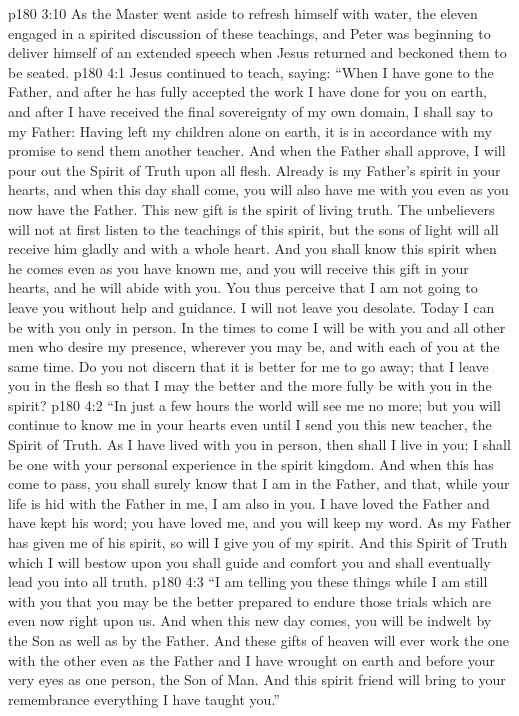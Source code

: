 \vs p180 3:10 As the Master went aside to refresh himself with water, the eleven engaged in a spirited discussion of these teachings, and Peter was beginning to deliver himself of an extended speech when Jesus returned and beckoned them to be seated.\plusone
{}
\vs p180 4:1 Jesus continued to teach, saying: \textcolor{ubdarkred}{“When I have gone to the Father, and after he has fully accepted the work I have done for you on earth, and after I have received the final sovereignty of my own domain, I shall say to my Father: Having left my children alone on earth, it is in accordance with my promise to send them another teacher. And when the Father shall approve, I will pour out the Spirit of Truth upon all flesh. Already is my Father’s spirit in your hearts, and when this day shall come, you will also have me with you even as you now have the Father. This new gift is the spirit of living truth. The unbelievers will not at first listen to the teachings of this spirit, but the sons of light will all receive him gladly and with a whole heart. And you shall know this spirit when he comes even as you have known me, and you will receive this gift in your hearts, and he will abide with you. You thus perceive that I am not going to leave you without help and guidance. I will not leave you desolate. Today I can be with you only in person. In the times to come I will be with you and all other men who desire my presence, wherever you may be, and with each of you at the same time. Do you not discern that it is better for me to go away; that I leave you in the flesh so that I may the better and the more fully be with you in the spirit?}
\vs p180 4:2 \textcolor{ubdarkred}{“In just a few hours the world will see me no more; but you will continue to know me in your hearts even until I send you this new teacher, the Spirit of Truth. As I have lived with you in person, then shall I live in you; I shall be one with your personal experience in the spirit kingdom. And when this has come to pass, you shall surely know that I am in the Father, and that, while your life is hid with the Father in me, I am also in you. I have loved the Father and have kept his word; you have loved me, and you will keep my word. As my Father has given me of his spirit, so will I give you of my spirit. And this Spirit of Truth which I will bestow upon you shall guide and comfort you and shall eventually lead you into all truth.}
\vs p180 4:3 \textcolor{ubdarkred}{“I am telling you these things while I am still with you that you may be the better prepared to endure those trials which are even now right upon us. And when this new day comes, you will be indwelt by the Son as well as by the Father. And these gifts of heaven will ever work the one with the other even as the Father and I have wrought on earth and before your very eyes as one person, the Son of Man. And this spirit friend will bring to your remembrance everything I have taught you.”}
